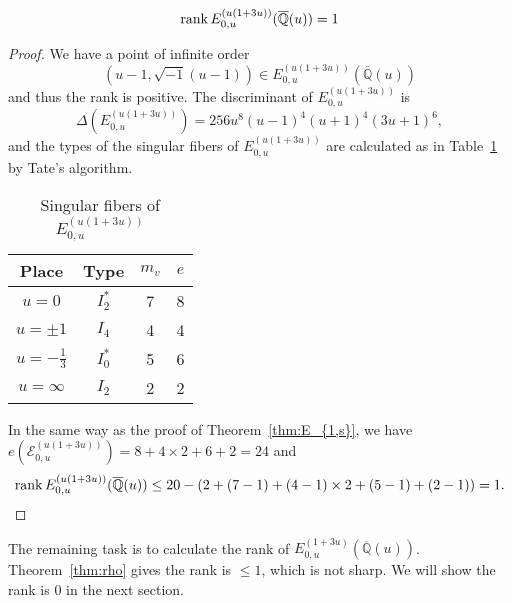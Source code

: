 \documentclass[main]{subfiles}
\begin{document}
\begin{thm}
    \begin{equation*}
        \operatorname{rank} E_{0,u}^{(u(1 + 3u))}(\overline{\mathbb{Q}}(u)) = 1
    \end{equation*}
\end{thm}
\begin{proof}
    We have a point of infinite order
    \begin{equation*}
        (u - 1, \sqrt{-1}(u - 1)) \in E_{0,u}^{(u(1 + 3u))}(\overline{\mathbb{Q}}(u))
    \end{equation*}
    and thus the rank is positive.
    The discriminant of $E_{0,u}^{(u(1 + 3u))}$ is
    \begin{equation*}
        \Delta(E_{0,u}^{(u(1 + 3u))}) = 256u^{8}(u - 1)^{4}(u + 1)^{4}(3u + 1)^{6},
    \end{equation*}
    and the types of the singular fibers of $E_{0,u}^{(u(1 + 3u))}$ are calculated as in Table~\ref{tab:E_{0,u}^{(u(1 + 3u))}} by Tate's algorithm.
    \begin{table}[H]
        \centering
        \caption{Singular fibers of $E_{0,u}^{(u(1 + 3u))}$}
        \begin{tabular}{|c|c|c|c|}
            \hline
            Place            & Type    & $m_v$ & $e$ \\
            \hline
            $u=0$            & $I_2^*$ & 7     & 8   \\
            $u=\pm 1$        & $I_4$   & 4     & 4   \\
            $u=-\frac{1}{3}$ & $I_0^*$ & 5     & 6   \\
            $u=\infty$       & $I_2$   & 2     & 2   \\
            \hline
        \end{tabular}
        \label{tab:E_{0,u}^{(u(1 + 3u))}}
    \end{table}
    In the same way as the proof of Theorem~\ref{thm:E_{1,s}}, we have $e(\mathcal{E}_{0,u}^{(u(1 + 3u))}) = 8 + 4 \times 2 + 6 + 2 = 24$ and
    \begin{equation*}
        \operatorname{rank} E_{0,u}^{(u(1 + 3u))}(\overline{\mathbb{Q}}(u)) \leq 20 - (2 + (7 - 1) + (4 - 1) \times 2 + (5 - 1) + (2 - 1)) = 1.
    \end{equation*}
\end{proof}

The remaining task is to calculate the rank of $E_{0,u}^{(1 + 3u)}(\overline{\mathbb{Q}}(u))$.
Theorem~\ref{thm:rho} gives the rank is $\leq 1$, which is not sharp.
We will show the rank is $0$ in the next section.
\end{document}
